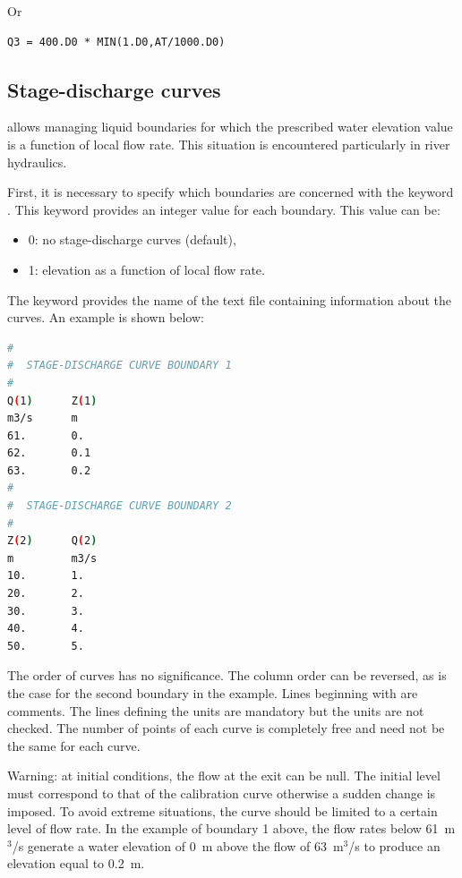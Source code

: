 Or

\begin{lstlisting}[language=TelFortran]
Q3 = 400.D0 * MIN(1.D0,AT/1000.D0)
\end{lstlisting}

\subsection{Stage-discharge curves}
\label{sec:discharge}
 allows managing liquid boundaries for which the prescribed water
elevation value is a function of local flow rate. This situation is encountered
particularly in river hydraulics.

First, it is necessary to specify which boundaries are concerned with the
keyword . This keyword provides an integer value
for each boundary. This value can be:

\begin{itemize}
\item 0: no stage-discharge curves (default),

\item 1: elevation as a function of local flow rate.
\end{itemize}

The keyword  provides the name of the text
file containing information about the curves. An example is shown below:

\begin{lstlisting}[language=bash]
#
#  STAGE-DISCHARGE CURVE BOUNDARY 1
#
Q(1)      Z(1)
m3/s      m
61.       0.
62.       0.1
63.       0.2
#
#  STAGE-DISCHARGE CURVE BOUNDARY 2
#
Z(2)      Q(2)
m         m3/s
10.       1.
20.       2.
30.       3.
40.       4.
50.       5.
\end{lstlisting}

The order of curves has no significance. The column order can be reversed, as
is the case for the second boundary in the example.
Lines beginning with \telfile{\#} are comments.
The lines defining the units are mandatory but the units are not checked.
The number of points of each curve is completely free and need not be
the same for each curve.

Warning: at initial conditions, the flow at the exit can be null. The initial
level must correspond to that of the calibration curve otherwise a sudden
change is imposed. To avoid extreme situations, the curve should be limited to
a certain level of flow rate. In the example of boundary 1 above, the flow
rates below 61~m${}^{3}$/s generate a water elevation of 0~m above the flow of
63~m${}^{3}$/s to produce an elevation equal to 0.2~m.
\\

